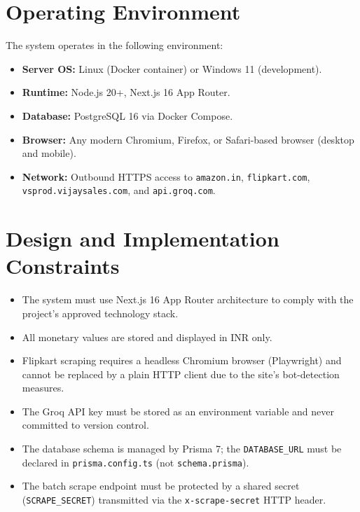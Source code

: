 \documentclass[12pt,a4paper]{report}
\begin{document}
\section{Operating Environment}
The system operates in the following environment:

\begin{itemize}[noitemsep]
  \item \textbf{Server OS:} Linux (Docker container) or Windows 11 (development).
  \item \textbf{Runtime:} Node.js 20+, Next.js 16 App Router.
  \item \textbf{Database:} PostgreSQL 16 via Docker Compose.
  \item \textbf{Browser:} Any modern Chromium, Firefox, or Safari-based browser
        (desktop and mobile).
  \item \textbf{Network:} Outbound HTTPS access to \texttt{amazon.in},
        \texttt{flipkart.com}, \texttt{vsprod.vijaysales.com}, and
        \texttt{api.groq.com}.
\end{itemize}

\section{Design and Implementation Constraints}
\begin{itemize}[noitemsep]
  \item The system must use Next.js 16 App Router architecture to comply with
        the project's approved technology stack.
  \item All monetary values are stored and displayed in INR only.
  \item Flipkart scraping requires a headless Chromium browser (Playwright)
        and cannot be replaced by a plain HTTP client due to the site's
        bot-detection measures.
  \item The Groq API key must be stored as an environment variable and never
        committed to version control.
  \item The database schema is managed by Prisma 7; the \texttt{DATABASE\_URL}
        must be declared in \texttt{prisma.config.ts} (not \texttt{schema.prisma}).
  \item The batch scrape endpoint must be protected by a shared secret
        (\texttt{SCRAPE\_SECRET}) transmitted via the \texttt{x-scrape-secret}
        HTTP header.
\end{itemize}

\end{document}

